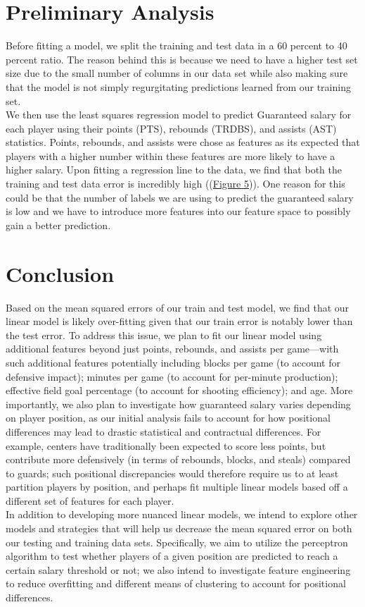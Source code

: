 \documentclass{article}
\begin{document}
\section{Preliminary Analysis}
Before fitting a model, we split the training and test data in a 60 percent to 40 percent ratio. The reason behind this is because we need to have a higher test set size due to the small number of columns in our data set while also making sure that the model is not simply regurgitating predictions learned from our training set.\\
We then use the least squares regression model to predict Guaranteed salary for each player using their points (PTS), rebounds (TRDBS), and assists (AST) statistics. Points, rebounds, and assists were chose as features as its expected that players with a higher number within these features are more likely to have a higher salary. Upon fitting a regression line to the data, we find that both the training and test data error is incredibly high ((\hyperref[sec:Appendix]{Figure 5})). One reason for this could be that the number of labels we are using to predict the guaranteed salary is low and we have to introduce more features into our feature space to possibly gain a better prediction. 

\section{Conclusion}
Based on the mean squared errors of our train and test model, we find that our linear model is likely over-fitting given that our train error is notably lower than the test error. To address this issue, we plan to fit our linear model using additional features beyond just points, rebounds, and assists per game—with such additional features potentially including blocks per game (to account for defensive impact); minutes per game (to account for per-minute production); effective field goal percentage (to account for shooting efficiency); and age. More importantly, we also plan to investigate how guaranteed salary varies depending on player position, as our initial analysis fails to account for how positional differences may lead to drastic statistical and contractual differences. For example, centers have traditionally been expected to score less points, but contribute more defensively (in terms of rebounds, blocks, and steals) compared to guards; such positional discrepancies would therefore require us to at least partition players by position, and perhaps fit multiple linear models based off a different set of features for each player.\\
In addition to developing more nuanced linear models, we intend to explore other models and strategies that will help us decrease the mean squared error on both our testing and training data sets. Specifically, we aim to utilize the perceptron algorithm to test whether players of a given position are predicted to reach a certain salary threshold or not; we also intend to investigate feature engineering to reduce overfitting and different means of clustering to account for positional differences.
\end{document}

